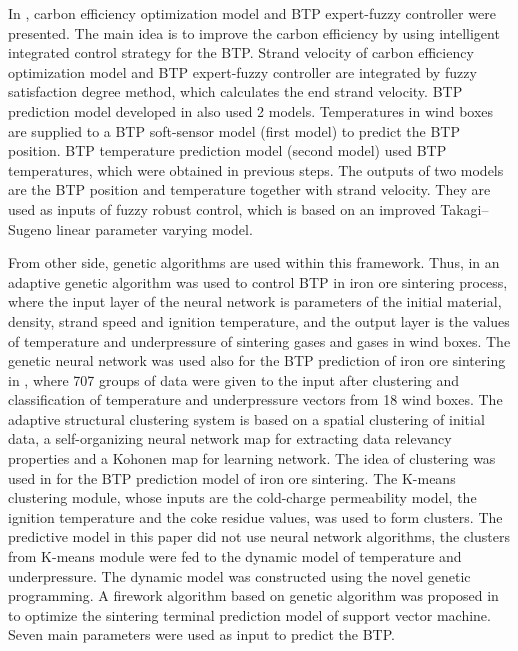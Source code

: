\documentclass[AMS,STIX2COL]{WileyNJD-v2}
\begin{document}
In \cite{Du2019}, carbon efficiency optimization model and BTP expert-fuzzy controller were presented. The main idea is to improve the carbon efficiency by using intelligent integrated control strategy for the BTP. Strand velocity of carbon efficiency optimization model and BTP expert-fuzzy controller are integrated by fuzzy satisfaction degree method, which calculates the end strand velocity.
BTP prediction model developed in \cite{Chen2017} also used 2 models.
Temperatures in wind boxes are supplied to a BTP soft-sensor model (first model) to predict the BTP position. BTP temperature prediction model (second model) used BTP temperatures, which were obtained in previous steps. The outputs of two models are the BTP position and temperature together with strand velocity. They are used as inputs of fuzzy robust control, which is based on an improved Takagi–Sugeno linear parameter varying model.

From other side, genetic algorithms are used within this framework. Thus, in \cite{Wu-ShanCheng2005} an adaptive genetic algorithm was used to control BTP in iron ore sintering process, where the input layer of the neural network is parameters of the initial material, density, strand speed and ignition temperature, and the output layer is the values of temperature and underpressure of sintering gases and gases in wind boxes. The genetic neural network was used also for the BTP prediction of iron ore sintering in \cite{Cheng2006}, where 707 groups of data were given to the input after clustering and classification of temperature and underpressure vectors from 18 wind boxes. The adaptive structural clustering system is based on a spatial clustering of initial data, a self-organizing neural network map for extracting data relevancy properties and a Kohonen map for learning network. The idea of clustering was used in \cite{Shang2010} for the BTP prediction model of iron ore sintering. The K-means clustering module, whose inputs are the cold-charge permeability model, the ignition temperature and the coke residue values, was used to form clusters. The predictive model in this paper did not use neural network algorithms, the clusters from K-means module were fed to the dynamic model of temperature and underpressure. The dynamic model was constructed using the novel genetic programming. A firework algorithm based on genetic algorithm was proposed in \cite{Wang2018} to optimize the sintering terminal prediction model of support vector machine. Seven main parameters were used as input to predict the BTP.
\end{document}

